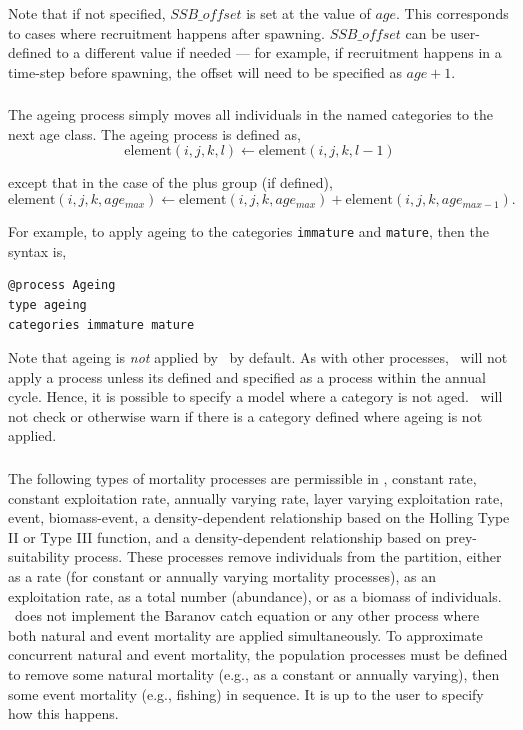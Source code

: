 Note that if not specified, $SSB\_offset$ is set at the value of $age$. This corresponds to cases where recruitment happens after spawning. $SSB\_offset$ can be user-defined to a different value if needed --- for example, if recruitment happens in a time-step before spawning, the offset will need to be specified as $age + 1$.

\subsubsection{\label{sec:ageing}}

The ageing process simply moves all individuals in the named categories to the next age class. The ageing process is defined as,
\begin{equation}
  \text{element}(i,j,k,l) \leftarrow \text{element}(i,j,k,l-1)
\end{equation}

except that in the case of the plus group (if defined), 
\begin{equation}
  \text{element}(i,j,k,age_{max}) \leftarrow \text{element}(i,j,k,age_{max}) + \text{element}(i,j,k,age_{max-1}).
\end{equation}

For example, to apply ageing to the categories \texttt{immature} and \texttt{mature}, then the syntax is,
{\small{\begin{verbatim}
@process Ageing
type ageing
categories immature mature
\end{verbatim}}}

Note that ageing is \emph{not} applied by \SPM\ by default. As with other processes, \SPM\ will not apply a process unless its defined and specified as a process within the annual cycle. Hence, it is possible to specify a model where a category is not aged. \SPM\ will not check or otherwise warn if there is a category defined where ageing is not applied.

\subsubsection{\label{sec:mortality}}

The following types of mortality processes are permissible in \SPM, constant rate, constant exploitation rate, annually varying rate, layer varying exploitation rate, event, biomass-event, a density-dependent relationship based on the Holling \citep{Holling1959} Type II or Type III function, and a density-dependent relationship based on prey-suitability process. These processes remove individuals from the partition, either as a rate (for constant or annually varying mortality processes), as an exploitation rate, as a total number (abundance), or as a biomass of individuals. \SPM\ does not implement the Baranov catch equation or any other process where both natural and event mortality are applied simultaneously. To approximate concurrent natural and event mortality, the population processes must be defined to remove some natural mortality (e.g., as a constant or annually varying), then some event mortality (e.g., fishing) in sequence. It is up to the user to specify how this happens.

